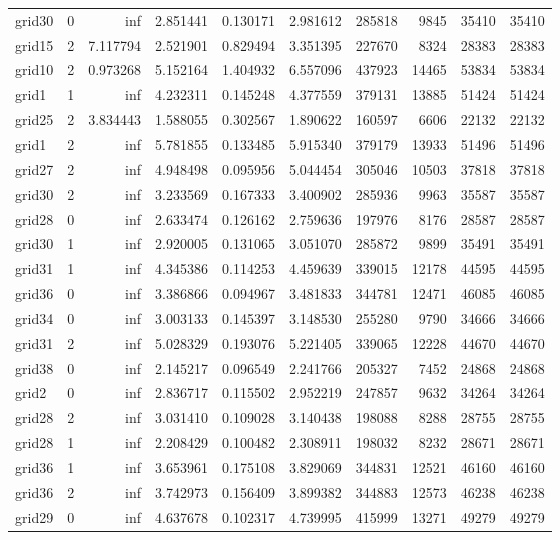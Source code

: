 \begin{longtable}{|l|r|r|r|r|r|r|r|r|r|}
grid30 & 0 & inf & 2.851441 & 0.130171 & 2.981612 & 285818 & 9845 & 35410 & 35410 \\
grid15 & 2 & 7.117794 & 2.521901 & 0.829494 & 3.351395 & 227670 & 8324 & 28383 & 28383 \\
grid10 & 2 & 0.973268 & 5.152164 & 1.404932 & 6.557096 & 437923 & 14465 & 53834 & 53834 \\
grid1 & 1 & inf & 4.232311 & 0.145248 & 4.377559 & 379131 & 13885 & 51424 & 51424 \\
grid25 & 2 & 3.834443 & 1.588055 & 0.302567 & 1.890622 & 160597 & 6606 & 22132 & 22132 \\
grid1 & 2 & inf & 5.781855 & 0.133485 & 5.915340 & 379179 & 13933 & 51496 & 51496 \\
grid27 & 2 & inf & 4.948498 & 0.095956 & 5.044454 & 305046 & 10503 & 37818 & 37818 \\
grid30 & 2 & inf & 3.233569 & 0.167333 & 3.400902 & 285936 & 9963 & 35587 & 35587 \\
grid28 & 0 & inf & 2.633474 & 0.126162 & 2.759636 & 197976 & 8176 & 28587 & 28587 \\
grid30 & 1 & inf & 2.920005 & 0.131065 & 3.051070 & 285872 & 9899 & 35491 & 35491 \\
grid31 & 1 & inf & 4.345386 & 0.114253 & 4.459639 & 339015 & 12178 & 44595 & 44595 \\
grid36 & 0 & inf & 3.386866 & 0.094967 & 3.481833 & 344781 & 12471 & 46085 & 46085 \\
grid34 & 0 & inf & 3.003133 & 0.145397 & 3.148530 & 255280 & 9790 & 34666 & 34666 \\
grid31 & 2 & inf & 5.028329 & 0.193076 & 5.221405 & 339065 & 12228 & 44670 & 44670 \\
grid38 & 0 & inf & 2.145217 & 0.096549 & 2.241766 & 205327 & 7452 & 24868 & 24868 \\
grid2 & 0 & inf & 2.836717 & 0.115502 & 2.952219 & 247857 & 9632 & 34264 & 34264 \\
grid28 & 2 & inf & 3.031410 & 0.109028 & 3.140438 & 198088 & 8288 & 28755 & 28755 \\
grid28 & 1 & inf & 2.208429 & 0.100482 & 2.308911 & 198032 & 8232 & 28671 & 28671 \\
grid36 & 1 & inf & 3.653961 & 0.175108 & 3.829069 & 344831 & 12521 & 46160 & 46160 \\
grid36 & 2 & inf & 3.742973 & 0.156409 & 3.899382 & 344883 & 12573 & 46238 & 46238 \\
grid29 & 0 & inf & 4.637678 & 0.102317 & 4.739995 & 415999 & 13271 & 49279 & 49279 \\

\end{longtable}
